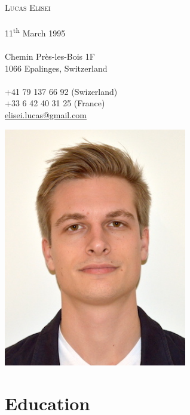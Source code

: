 \documentclass[a4paper,10pt]{article}
\begin{document}
\begin{minipage}{0.6\textwidth}
    {\huge \textsc{Lucas Elisei}} \\
    \\
    11\textsuperscript{th} March 1995 \\
    \\
    Chemin Près-les-Bois 1F \\
    1066 Epalinges, Switzerland \\
    \\
    +41 79 137 66 92 (Swizerland) \\
    +33 6 42 40 31 25 (France) \\
    \href{mailto:elisei.lucas@gmail.com}{elisei.lucas@gmail.com}
\end{minipage} %
\begin{minipage}{0.4\textwidth}
    \begin{flushright}
        \includegraphics[width=0.6\textwidth]{photo.jpg}
    \end{flushright}
\end{minipage}

\vspace*{0.5cm}

\iffalse
\begin{framed}
    \centering
    \large{\textsc{
        Master student looking for a summer internship
    }}
\end{framed}
\else
\vspace*{1.2cm}
\fi

\section{Education}
\end{document}
